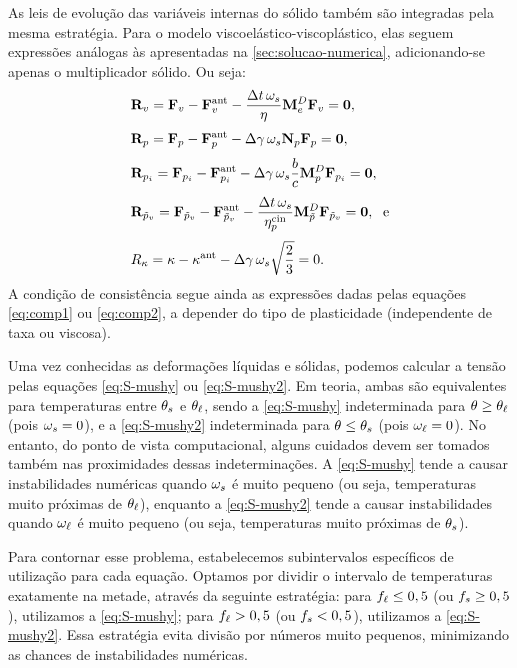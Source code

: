 \documentclass[Tese.tex]{subfiles}
\begin{document}
As leis de evolução das variáveis internas do sólido também são integradas pela mesma estratégia. Para o modelo viscoelástico-viscoplástico, elas seguem expressões análogas às apresentadas na \cref{sec:solucao-numerica}, adicionando-se apenas o multiplicador sólido. Ou seja:
\begin{align}
& \mathbf{R}_v = \mathbf{F}_v-\mathbf{F}_v^\text{ant} - \dfrac{\Delta t\,\omega_s}{\eta}\mathbf{M}_e^D\mathbf{F}_v = \mathbf{0}, \label{eq:evol-Fv-disc-mushy}\\[0.1cm]
& \mathbf{R}_p = \mathbf{F}_p - \mathbf{F}_p^\text{ant} - \Delta{\gamma}\,\omega_s\mathbf{N}_p\mathbf{F}_p = \mathbf{0}, \label{eq:evol-Fp-disc-mushy}\\[0.1cm]
& \mathbf{R}_{p_i} = \mathbf{F}_{p_i} - \mathbf{F}_{p_i}^\text{ant} - \Delta{\gamma}\,\omega_s\dfrac{b}{c}\mathbf{M}_p^D\mathbf{F}_{p_i} = \mathbf{0}, \label{eq:evol-Fpi-disc-mushy}  \\[0.1cm]
& \mathbf{R}_{\tilde{p}_v} = \mathbf{F}_{\tilde{p}_v} - \mathbf{F}_{\tilde{p}_v}^\text{ant} - \dfrac{\Delta t\,\omega_s}{\eta_{p}^\text{cin}}\mathbf{M}_{\tilde{p}}^D\mathbf{F}_{\tilde{p}_v} = \mathbf{0}, \text{\; e}  \label{eq:evol-Fvi-disc-mushy} \\[0.1cm]
& R_{\kappa} = \kappa - \kappa^\text{ant} - \Delta{\gamma}\,\omega_s\sqrt{\dfrac{2}{3}} = 0. \label{eq:evol-encruamento-disc-mushy}
\end{align}
A condição de consistência segue ainda as expressões dadas pelas equações \eqref{eq:comp1} ou \eqref{eq:comp2}, a depender do tipo de plasticidade (independente de taxa ou viscosa).

Uma vez conhecidas as deformações líquidas e sólidas, podemos calcular a tensão pelas equações \eqref{eq:S-mushy} ou \eqref{eq:S-mushy2}. Em teoria, ambas são equivalentes para temperaturas entre $\theta_s$ e $\theta_\ell$, sendo a \cref{eq:S-mushy} indeterminada para $\theta \geq \theta_\ell$ (pois $\omega_s = 0$), e a \cref{eq:S-mushy2} indeterminada para $\theta \leq \theta_s$ (pois $\omega_\ell = 0$). No entanto, do ponto de vista computacional, alguns cuidados devem ser tomados também nas proximidades dessas indeterminações. A \cref{eq:S-mushy} tende a causar instabilidades numéricas quando $\omega_s$ é muito pequeno (ou seja, temperaturas muito próximas de $\theta_\ell$), enquanto a \cref{eq:S-mushy2} tende a causar instabilidades quando $\omega_\ell$ é muito pequeno (ou seja, temperaturas muito próximas de $\theta_s$). 

Para contornar esse problema, estabelecemos subintervalos específicos de utilização para cada equação. Optamos por dividir o intervalo de temperaturas exatamente na metade, através da seguinte estratégia: para $f_\ell \leq 0,5$ (ou $f_s \geq 0,5$), utilizamos a \cref{eq:S-mushy}; para $f_\ell > 0,5$ (ou $f_s < 0,5$), utilizamos a \cref{eq:S-mushy2}. Essa estratégia evita divisão por números muito pequenos, minimizando as chances de instabilidades numéricas.
\end{document}

